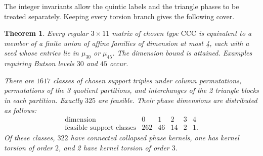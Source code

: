 \documentclass[11pt,a4paper]{article}
\newtheorem{theorem}{Theorem}[section]
\theoremstyle{plain}
\theoremstyle{definition}
\theoremstyle{plain}
\begin{document}
The integer invariants allow the quintic labels and the triangle phases to be treated separately. Keeping every torsion branch gives the following cover.

\par\addvspace{\medskipamount}\noindent
\begin{minipage}{\linewidth}
\begin{theorem}\label{n11_noA_CCC:main}
Every regular $3\times11$ matrix of chosen type $\mathrm{CCC}$ is equivalent to a member of a finite union of affine families of dimension at most 4, each with a seed whose entries lie in $\mu_{30}$ or $\mu_{45}$. The dimension bound is attained. Examples requiring Butson levels $30$ and $45$ occur.

There are $1617$ classes of chosen support triples under column permutations, permutations of the 3 quotient partitions, and interchanges of the 2 triangle blocks in each partition. Exactly $325$ are feasible. Their phase dimensions are distributed as follows:
$$\begin{array}{c|rrrrr}
\text{dimension}&0&1&2&3&4\\\hline
\text{feasible support classes}&262&46&14&2&1.
\end{array}$$
Of these classes, $322$ have connected collapsed phase kernels, one has kernel torsion of order $2$, and 2 have kernel torsion of order $3$.
\end{theorem}
\end{minipage}
\par\addvspace{\medskipamount}
\end{document}

